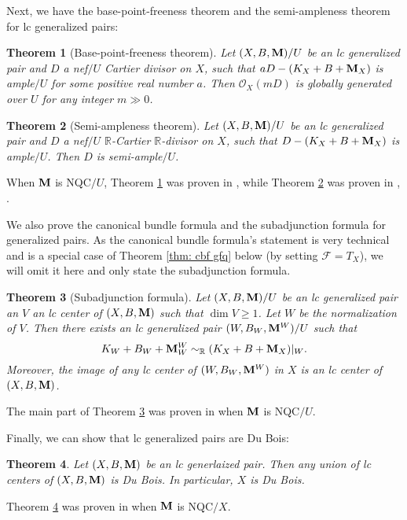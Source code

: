 \documentclass[11pt]{amsart}
\numberwithin{equation}{section}
\newcommand{\Mm}{{\bf{M}}}
\newcommand{\Rr}{\mathbb{R}}
\newcommand{\Ff}{\mathcal{F}}
\newtheorem{thm}{Theorem}[subsection]
\theoremstyle{definition}
\theoremstyle{definition}
\theoremstyle{definition}
\begin{document}
\smallskip

Next, we have the base-point-freeness theorem and the semi-ampleness theorem for lc generalized pairs:

\begin{thm}[Base-point-freeness theorem]\label{thm:base-point-freeness intro}
Let $(X,B,\Mm)/U$ be an lc generalized pair and $D$ a nef$/U$ Cartier divisor on $X$, such that $aD-(K_X+B+\Mm_X)$ is ample$/U$ for some positive real number $a$. Then $\mathcal{O}_X(mD)$ is globally generated over $U$ for any integer $m\gg 0$.
\end{thm}

\begin{thm}[Semi-ampleness theorem]\label{thm: semi-ampleness intro}
Let $(X,B,\Mm)/U$ be an lc generalized pair and $D$ a nef$/U$ $\mathbb R$-Cartier $\Rr$-divisor on $X$, such that $D-(K_X+B+\Mm_X)$ is ample$/U$. Then $D$ is semi-ample$/U$.
\end{thm}

When $\Mm$ is NQC$/U$, Theorem \ref{thm:base-point-freeness intro} was proven in \cite[Theorem 1.4]{Xie22}, \cite[Theorem 1.5]{CLX23} while Theorem \ref{thm: semi-ampleness intro} was proven in \cite[Theorems 1.2]{Xie22}, \cite[Theorem 1.6]{CLX23}.

We also prove the canonical bundle formula and the subadjunction formula for generalized pairs. As the canonical bundle formula's statement is very technical and is a special case of Theorem \ref{thm: cbf gfq} below (by setting $\Ff=T_X$), we will omit it here and only state the subadjunction formula.

\begin{thm}[Subadjunction formula]\label{thm: subadj intro}
    Let $(X,B,\Mm)/U$ be an lc generalized pair an $V$ an lc center of $(X,B,\Mm)$ such that $\dim V\geq 1$. Let $W$ be the normalization of $V$. Then there exists an lc generalized pair $(W,B_W,\Mm^W)/U$ such that
    $$K_W+B_W+\Mm^W_W\sim_{\mathbb R}(K_X+B+\Mm_X)|_W.$$
    Moreover, the image of any lc center of $(W,B_W,\Mm^W)$ in $X$ is an lc center of $(X,B,\Mm)$.
\end{thm}
The main part of Theorem \ref{thm: subadj intro} was proven in \cite[Theorem 5.1]{HL21b} when $\Mm$ is NQC$/U$.

Finally, we can show that lc generalized pairs are Du Bois:

\begin{thm}\label{thm: glc sings are Du Bois}
Let $(X,B,\Mm)$ be an lc generlaized pair. Then any union of lc centers of $(X,B,\Mm)$ is Du Bois. In particular, $X$ is Du Bois.
\end{thm}
Theorem \ref{thm: glc sings are Du Bois} was proven in \cite[Theorem 1.6]{LX23b} when $\Mm$ is NQC$/X$.
\end{document}

